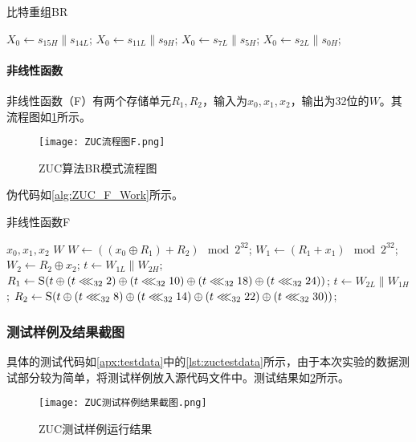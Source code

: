 \documentclass[a4paper, zihao=-4, UTF-8]{ctexart}
\begin{document}
					\begin{algorithm}[htbp]
						\caption{比特重组BR}
						\label{alg:ZUC_BR_Work}
						\begin{algorithmic}[1]
							\State $X_0\gets s_{15H} \| s_{14L}$;
							\State $X_0\gets s_{11L} \| s_{9H}$;
							\State $X_0\gets s_{7L} \| s_{5H}$;
							\State $X_0\gets s_{2L} \| s_{0H}$;
							\EndFunction
						\end{algorithmic}
					\end{algorithm}
					
					\paragraph{非线性函数}
					非线性函数（F）有两个存储单元$R_1, R_2$，输入为$x_0, x_1, x_2$，输出为32位的$W$。其流程图如\cref{fig:ZUC_F_flowchart}所示。
					\begin{figure}[htbp]
						\centering
						\texttt{[image: ZUC流程图F.png]}
						\caption{ZUC算法BR模式流程图}
						\label{fig:ZUC_F_flowchart}
					\end{figure}
					伪代码如\cref{alg:ZUC_F_Work}所示。
					
					\begin{algorithm}[htbp]
						\caption{非线性函数F}
						\label{alg:ZUC_F_Work}
						\begin{algorithmic}[1]
							\Require $x_0, x_1, x_2$
							\Ensure $W$
							\Function{F}{$x_0, x_1, x_2$}
							\State $W\gets ((x_0\oplus R_1) + R_2)\mod 2^{32}$;
							\State $W_1\gets (R_1+x_1)\mod 2^{32}$;
							\State $W_2\gets R_2\oplus x_2$;
							\State $t\gets W_{1L}\| W_{2H}$;
							\State $R_1\gets \Call{S}{t\oplus (t\lll_{32}2)\oplus (t\lll_{32}10)\oplus (t\lll_{32}18)\oplus (t\lll_{32}24)}$;
							\State $t\gets W_{2L}\| W_{1H}$;
							\State $R_2\gets \Call{S}{t\oplus (t\lll_{32}8)\oplus (t\lll_{32}14)\oplus (t\lll_{32}22)\oplus (t\lll_{32}30)}$;
							\State \Return{$W$}
							\EndFunction
						\end{algorithmic}
					\end{algorithm}
					
				\subsubsection{测试样例及结果截图}
					具体的测试代码如\cref{apx:testdata}中的\cref{lst:zuctestdata}所示，由于本次实验的数据测试部分较为简单，将测试样例放入源代码文件中。测试结果如\cref{fig:ZUC_result}所示。
					\begin{figure}[htb]
						\centering
						\texttt{[image: ZUC测试样例结果截图.png]}
						\caption{ZUC测试样例运行结果}
						\label{fig:ZUC_result}
					\end{figure}
\end{document}
